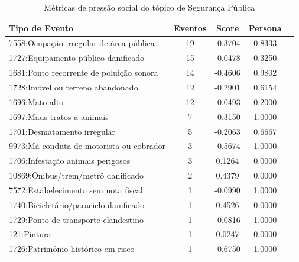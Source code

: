 \begin{table}[htbp]
	\centering
	\caption{Métricas de pressão social do tópico de Segurança Pública}
	\label{tab:eventos_populares_security}
	\begin{tabular}{|l|c|c|c|c|}
		\hline
		\textbf{Tipo de Evento}                     & \textbf{Eventos} & \textbf{Score} & \textbf{Persona} \\
		\hline
		7558:Ocupação irregular de área pública     & 19               & -0.3704        & 0.8333           \\
		\hline
		1727:Equipamento público danificado         & 15               & -0.0478        & 0.3250           \\
		\hline
		1681:Ponto recorrente de poluição sonora    & 14               & -0.4606        & 0.9802           \\
		\hline
		1728:Imóvel ou terreno abandonado           & 12               & -0.2901        & 0.6154           \\
		\hline
		1696:Mato alto                              & 12               & -0.0493        & 0.2000           \\
		\hline
		1697:Maus tratos a animais                  & 7                & -0.3150        & 1.0000           \\
		\hline
		1701:Desmatamento irregular                 & 5                & -0.2063        & 0.6667           \\
		\hline
		9973:Má conduta de motorista ou cobrador    & 3                & -0.5674        & 1.0000           \\
		\hline
		1706:Infestação animais perigosos           & 3                & 0.1264         & 0.0000           \\
		\hline
		10869:Ônibus/trem/metrô danificado          & 2                & 0.4379         & 0.0000           \\
		\hline
		7572:Estabelecimento sem nota fiscal        & 1                & -0.0990        & 1.0000           \\
		\hline
		1740:Bicicletário/paraciclo danificado      & 1                & 0.4526         & 0.0000           \\
		\hline
		1729:Ponto de transporte clandestino        & 1                & -0.0816        & 1.0000           \\
		\hline
		121:Pintura                                 & 1                & 0.0247         & 0.0000           \\
		\hline
		1726:Patrimônio histórico em risco          & 1                & -0.6750        & 1.0000           \\

\end{tabular}
\end{table}
